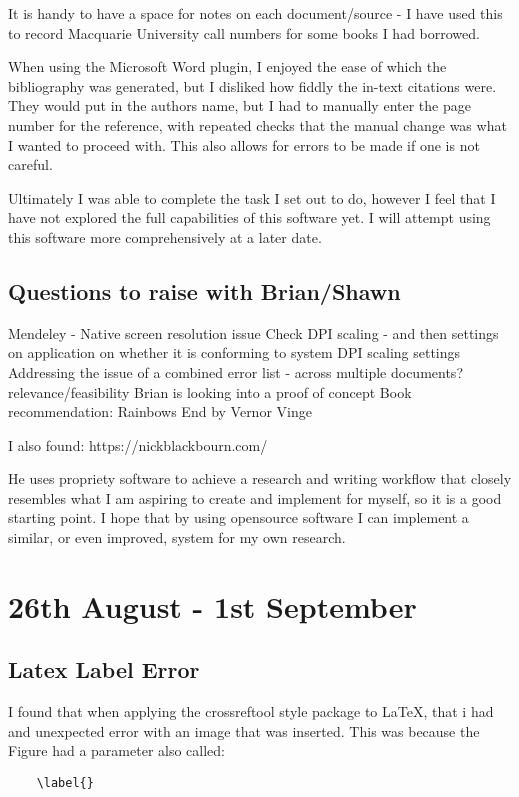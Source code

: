 \documentclass{article}
\begin{document}
It is handy to have a space for notes on each document/source - I have used this to record Macquarie University call numbers for some books I had borrowed. 

When using the Microsoft Word plugin, I enjoyed the ease of which the bibliography was generated, but I disliked how fiddly the in-text citations were. They would put in the authors name, but I had to manually enter the page number for the reference, with repeated checks that the manual change was what I wanted to proceed with. This also allows for errors to be made if one is not careful. 

Ultimately I was able to complete the task I set out to do, however I feel that I have not explored the full capabilities of this software yet. 
I will attempt using this software more comprehensively at a later date.

\subsection{Questions to raise with Brian/Shawn}
\begin{outline}[enumerate]
    \1 Mendeley - Native screen resolution issue
        \2 Check DPI scaling - and then settings on application on whether it is conforming to system DPI scaling settings
    \1 Addressing the issue of a combined error list - across multiple documents? relevance/feasibility 
        \2 Brian is looking into a proof of concept
    \1 Book recommendation: Rainbows End by Vernor Vinge
\end{outline}

I also found: https://nickblackbourn.com/

He uses propriety software to achieve a research and writing workflow that closely resembles what I am aspiring to create and implement for myself, so it is a good starting point. I hope that by using opensource software I can implement a similar, or even improved, system for my own research.

\section{26th August - 1st September}
\label{Error: LaTeX Label Error}
\subsection{Latex Label Error}

I found that when applying the crossreftool style package to LaTeX, that i had and unexpected error with an image that was inserted. This was because the Figure had a parameter also called:
\begin{verbatim}
    \label{}
\end{verbatim}
\end{document}
